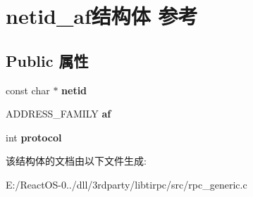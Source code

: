 \hypertarget{structnetid__af}{}\section{netid\+\_\+af结构体 参考}
\label{structnetid__af}
\subsection*{Public 属性}
\begin{DoxyCompactItemize}
\item 
\mbox{\label{structnetid__af_aabc33c57b00dc71b08d1bfdd2d0fa2fc}} 
const char $\ast$ {\bfseries netid}
\item 
\mbox{\label{structnetid__af_a6ac0f9d6bed3a6ac73701c72088a1eca}} 
A\+D\+D\+R\+E\+S\+S\+\_\+\+F\+A\+M\+I\+LY {\bfseries af}
\item 
\mbox{\label{structnetid__af_af4542d6f04cf966cd21bff58f0cc1a1a}} 
int {\bfseries protocol}
\end{DoxyCompactItemize}


该结构体的文档由以下文件生成\+:\begin{DoxyCompactItemize}
\item 
E\+:/\+React\+O\+S-\/0../dll/3rdparty/libtirpc/src/rpc\+\_\+generic.\+c\end{DoxyCompactItemize}

